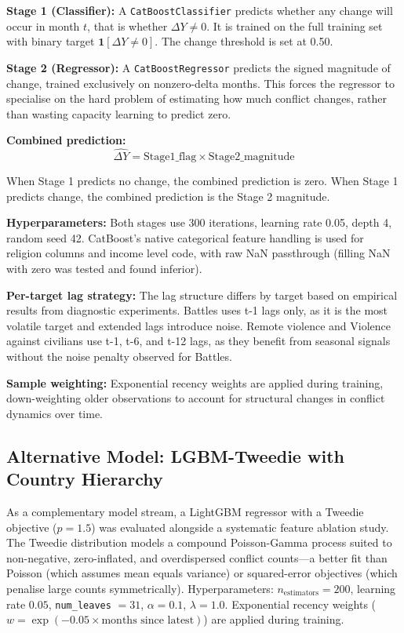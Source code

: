 \documentclass[12pt,a4paper]{article}
\begin{document}
\textbf{Stage 1 (Classifier):} A \texttt{CatBoostClassifier} predicts
whether any change will occur in month $t$, that is whether
$\Delta Y \neq 0$. It is trained on the full training set with binary
target $\mathbf{1}[\Delta Y \neq 0]$. The change threshold is set at 0.50.

\textbf{Stage 2 (Regressor):} A \texttt{CatBoostRegressor} predicts the
signed magnitude of change, trained exclusively on nonzero-delta months.
This forces the regressor to specialise on the hard problem of estimating
how much conflict changes, rather than wasting capacity learning to
predict zero.

\textbf{Combined prediction:}
\[
    \hat{\Delta Y} = \text{Stage1\_flag} \times \text{Stage2\_magnitude}
\]

When Stage 1 predicts no change, the combined prediction is zero. When
Stage 1 predicts change, the combined prediction is the Stage 2 magnitude.

\textbf{Hyperparameters:} Both stages use 300 iterations, learning rate
0.05, depth 4, random seed 42. CatBoost's native categorical feature
handling is used for religion columns and income level code, with raw NaN
passthrough (filling NaN with zero was tested and found inferior).

\textbf{Per-target lag strategy:} The lag structure differs by target
based on empirical results from diagnostic experiments. Battles uses
t-1 lags only, as it is the most volatile target and extended lags
introduce noise. Remote violence and Violence against civilians use
t-1, t-6, and t-12 lags, as they benefit from seasonal signals without
the noise penalty observed for Battles.

\textbf{Sample weighting:} Exponential recency weights are applied during
training, down-weighting older observations to account for structural
changes in conflict dynamics over time.

\subsection{Alternative Model: LGBM-Tweedie with Country Hierarchy}

As a complementary model stream, a LightGBM regressor with a Tweedie
objective ($p = 1.5$) was evaluated alongside a systematic feature
ablation study. The Tweedie distribution models a compound
Poisson-Gamma process suited to non-negative, zero-inflated, and
overdispersed conflict counts---a better fit than Poisson (which
assumes mean equals variance) or squared-error objectives (which
penalise large counts symmetrically). Hyperparameters:
$n_\text{estimators} = 200$, learning rate $0.05$,
\texttt{num\_leaves} $= 31$, $\alpha = 0.1$, $\lambda = 1.0$.
Exponential recency weights ($w = \exp(-0.05 \times \text{months
since latest})$) are applied during training.
\end{document}
